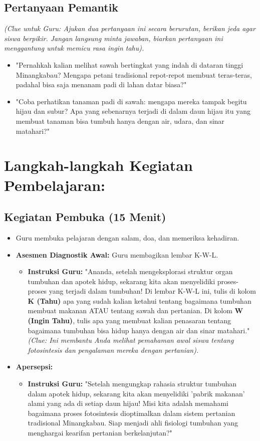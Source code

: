 \documentclass[a4paper,12pt]{article}
\begin{document}
\subsection{Pertanyaan Pemantik}
\textit{(Clue untuk Guru: Ajukan dua pertanyaan ini secara berurutan, berikan jeda agar siswa berpikir. Jangan langsung minta jawaban, biarkan pertanyaan ini menggantung untuk memicu rasa ingin tahu).}

\begin{itemize}
\item "Pernahkah kalian melihat sawah bertingkat yang indah di dataran tinggi Minangkabau? Mengapa petani tradisional repot-repot membuat teras-teras, padahal bisa saja menanam padi di lahan datar biasa?"
\item "Coba perhatikan tanaman padi di sawah: mengapa mereka tampak begitu hijau dan subur? Apa yang sebenarnya terjadi di dalam daun hijau itu yang membuat tanaman bisa tumbuh hanya dengan air, udara, dan sinar matahari?"
\end{itemize}

\section{Langkah-langkah Kegiatan Pembelajaran:}

\subsection{Kegiatan Pembuka (15 Menit)}
\begin{itemize}
\item Guru membuka pelajaran dengan salam, doa, dan memeriksa kehadiran.
\item \textbf{Asesmen Diagnostik Awal:} Guru membagikan lembar K-W-L.
    \begin{itemize}
    \item \textbf{Instruksi Guru:} "Ananda, setelah mengeksplorasi struktur organ tumbuhan dan apotek hidup, sekarang kita akan menyelidiki proses-proses yang terjadi dalam tumbuhan! Di lembar K-W-L ini, tulis di kolom \textbf{K (Tahu)} apa yang sudah kalian ketahui tentang bagaimana tumbuhan membuat makanan ATAU tentang sawah dan pertanian. Di kolom \textbf{W (Ingin Tahu)}, tulis apa yang membuat kalian penasaran tentang bagaimana tumbuhan bisa hidup hanya dengan air dan sinar matahari." \textit{(Clue: Ini membantu Anda melihat pemahaman awal siswa tentang fotosintesis dan pengalaman mereka dengan pertanian).}
    \end{itemize}
\item \textbf{Apersepsi:}
    \begin{itemize}
    \item \textbf{Instruksi Guru:} "Setelah mengungkap rahasia struktur tumbuhan dalam apotek hidup, sekarang kita akan menyelidiki 'pabrik makanan' alami yang ada di setiap daun hijau! Misi kita adalah memahami bagaimana proses fotosintesis dioptimalkan dalam sistem pertanian tradisional Minangkabau. Siap menjadi ahli fisiologi tumbuhan yang menghargai kearifan pertanian berkelanjutan?"
    \end{itemize}
\end{itemize}
\end{document}
